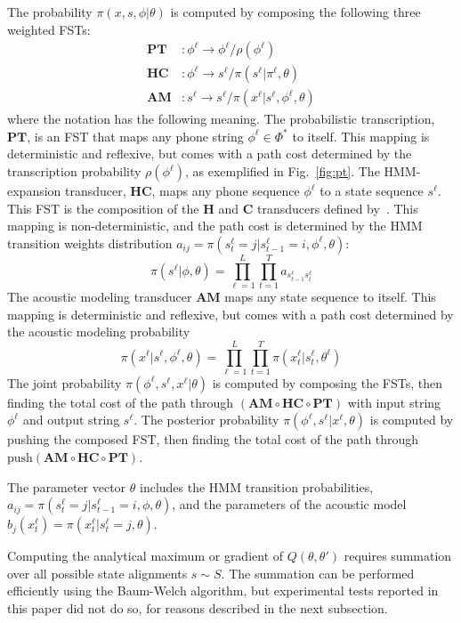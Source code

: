 The probability $\pi(x,s,\phi|\theta)$ is computed by composing the
following three weighted FSTs:
\begin{align}
  \mathbf{PT}&:\phi^\ell\rightarrow\phi^\ell/ \rho(\phi^\ell)\\
  \mathbf{HC}&:\phi^\ell\rightarrow s^\ell/ \pi(s^\ell|\pi^\ell,\theta)\\
  \mathbf{AM}&:s^\ell\rightarrow s^\ell/ \pi(x^\ell|s^\ell,\phi^\ell,\theta)
\end{align}
where the notation has the following meaning.  The probabilistic
transcription, $\mathbf{PT}$, is an FST that maps any phone string
$\phi^\ell\in\mathbb{\Phi}^*$ to itself.  This mapping is
deterministic and reflexive, but comes with a path cost determined by
the transcription probability $\rho(\phi^\ell)$, as exemplified in
Fig.~\ref{fig:pt}.  The HMM-expansion transducer, $\mathbf{HC}$, maps
any phone sequence $\phi^\ell$ to a state sequence $s^\ell$.  This FST
is the composition of the $\mathbf{H}$ and $\mathbf{C}$ transducers
defined by~\cite{Mohri2002}.  This mapping is non-deterministic, and
the path cost is determined by the HMM transition weights distribution
$a_{ij}=\pi(s_t^\ell =j|s_{t-1}^\ell =i,\phi^\ell,\theta)$:
\begin{equation}
  \pi(s^\ell|\phi,\theta)=\prod_{\ell=1}^L\prod_{t=1}^T
  a_{s_{t-1}^\ell s_t^\ell}
\end{equation}
The acoustic modeling transducer $\mathbf{AM}$ maps any state sequence
to itself.  This mapping is deterministic and reflexive, but comes
with a path cost determined by the acoustic modeling probability
\begin{equation}
  \pi(x^\ell|s^\ell,\phi^\ell,\theta)=\prod_{\ell=1}^L\prod_{t=1}^T
  \pi(x_t^\ell|s_t^\ell,\theta^\ell)
\end{equation}
The joint probability $\pi(\phi^\ell,s^\ell,x^\ell|\theta)$ is
computed by composing the FSTs, then finding the total cost of the
path through
$\left(\mathbf{AM}\circ\mathbf{HC}\circ\mathbf{PT}\right)$ with input
string $\phi^\ell$ and output string $s^\ell$.  The posterior
probability $\pi(\phi^\ell,s^\ell|x^\ell,\theta)$ is computed by
pushing the composed FST, then finding the total cost of the path
through
$\textrm{push}\left(\mathbf{AM}\circ\mathbf{HC}\circ\mathbf{PT}\right)$.

The parameter vector $\theta$ includes the HMM transition
probabilities, $a_{ij}=\pi(s_t^\ell =j|s_{t-1}^\ell =i,\phi,\theta)$,
and the parameters of the acoustic model
$b_j(x_t^\ell)=\pi(x_t^\ell|s_t^\ell=j,\theta)$.

Computing the analytical maximum or gradient of
$Q\left(\theta,\theta'\right)$ requires summation over all possible
state alignments $s\sim S$.  The summation can be performed
efficiently using the Baum-Welch algorithm, but experimental tests
reported in this paper did not do so, for reasons described in the
next subsection.

